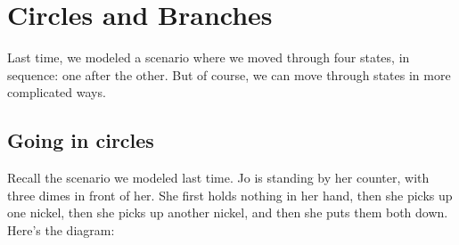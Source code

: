 \documentclass[../../../main.tex]{subfiles}
\begin{document}
\chapter{Circles and Branches}


Last time, we modeled a scenario where we moved through four states, in sequence: one after the other. But of course, we can move through states in more complicated ways.


\section{Going in circles}

Recall the scenario we modeled last time. Jo is standing by her counter, with three dimes in front of her. She first holds nothing in her hand, then she picks up one nickel, then she picks up another nickel, and then she puts them both down. Here's the diagram:
\end{document}
